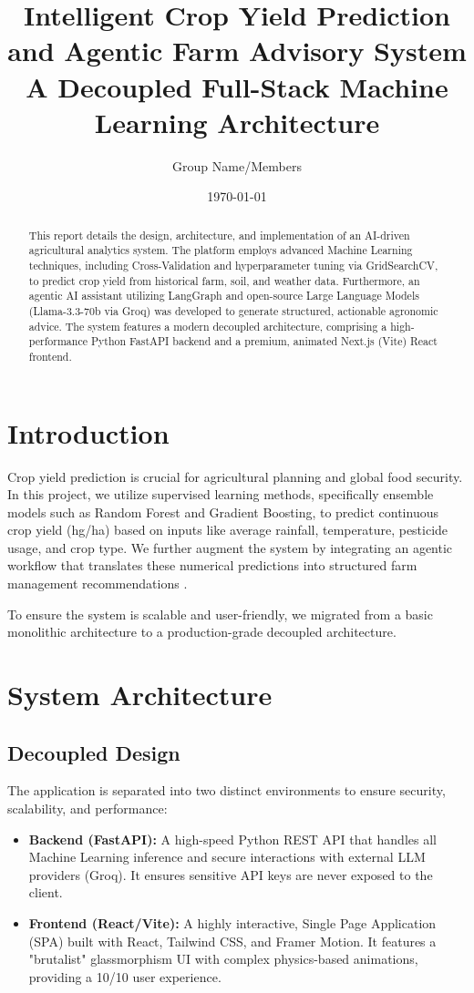 \documentclass[12pt,a4paper]{article}
\title{\textbf{Intelligent Crop Yield Prediction and Agentic Farm Advisory System} \\ \large A Decoupled Full-Stack Machine Learning Architecture}
\author{Group Name/Members}
\date{\today}
\begin{document}
\maketitle

\begin{abstract}
This report details the design, architecture, and implementation of an AI-driven agricultural analytics system. The platform employs advanced Machine Learning techniques, including Cross-Validation and hyperparameter tuning via GridSearchCV, to predict crop yield from historical farm, soil, and weather data. Furthermore, an agentic AI assistant utilizing LangGraph and open-source Large Language Models (Llama-3.3-70b via Groq) was developed to generate structured, actionable agronomic advice. The system features a modern decoupled architecture, comprising a high-performance Python FastAPI backend and a premium, animated Next.js (Vite) React frontend.
\end{abstract}

\section{Introduction}
Crop yield prediction is crucial for agricultural planning and global food security. In this project, we utilize supervised learning methods, specifically ensemble models such as Random Forest and Gradient Boosting, to predict continuous crop yield (hg/ha) based on inputs like average rainfall, temperature, pesticide usage, and crop type. We further augment the system by integrating an agentic workflow that translates these numerical predictions into structured farm management recommendations \cite{langgraph_docs}. 

To ensure the system is scalable and user-friendly, we migrated from a basic monolithic architecture to a production-grade decoupled architecture.

\section{System Architecture}

\subsection{Decoupled Design}
The application is separated into two distinct environments to ensure security, scalability, and performance:
\begin{itemize}
    \item \textbf{Backend (FastAPI):} A high-speed Python REST API that handles all Machine Learning inference and secure interactions with external LLM providers (Groq). It ensures sensitive API keys are never exposed to the client.
    \item \textbf{Frontend (React/Vite):} A highly interactive, Single Page Application (SPA) built with React, Tailwind CSS, and Framer Motion. It features a "brutalist" glassmorphism UI with complex physics-based animations, providing a 10/10 user experience.
\end{itemize}
\end{document}
